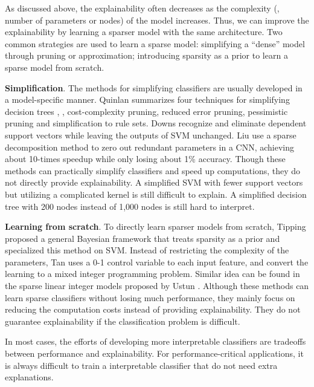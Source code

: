 As discussed above, the explainability often decreases as the complexity (\ie, number of parameters or nodes) of the model increases. Thus, we can improve the explainability by learning a sparser model with the same architecture. Two common strategies are used to learn a sparse model: simplifying a ``dense'' model through pruning or approximation; introducing sparsity as a prior to learn a sparse model from scratch. 


\textbf{Simplification}. The methods for simplifying classifiers are usually developed in a model-specific manner. Quinlan summarizes four techniques for simplifying decision trees \cite{quinlan1987simplifying}, \ie, cost-complexity pruning, reduced error pruning, pessimistic pruning and simplification to rule sets. Downs \etal \cite{downs2001simplifysvm} recognize and eliminate dependent support vectors while leaving the outputs of SVM unchanged. Liu \etal \cite{liu2015sparsecnn} use a sparse decomposition method to zero out redundant parameters in a CNN, achieving about 10-times speedup while only losing about 1\% accuracy. Though these methods can practically simplify classifiers and speed up computations, they do not directly provide explainability. A simplified SVM with fewer support vectors but utilizing a complicated kernel is still difficult to explain. A simplified decision tree with 200 nodes instead of 1,000 nodes is still hard to interpret.

\textbf{Learning from scratch}. To directly learn sparser models from scratch, Tipping \cite{tipping2001sparse} proposed a general Bayesian framework that treats sparsity as a prior and specialized this method on SVM. Instead of restricting the complexity of the parameters, Tan \etal \cite{tan2010sparsesvm} uses a 0-1 control variable to each input feature, and convert the learning to a mixed integer programming problem. Similar idea can be found in the sparse linear integer models proposed by Ustun \etal \cite{ustun2016supersparse}. Although these methods can learn sparse classifiers without losing much performance, they mainly focus on reducing the computation costs instead of providing explainability. They do not guarantee explainability if the classification problem is difficult.

In most cases, the efforts of developing more interpretable classifiers are tradeoffs between performance and explainability. For performance-critical applications, it is always difficult to train a interpretable classifier that do not need extra explanations.

